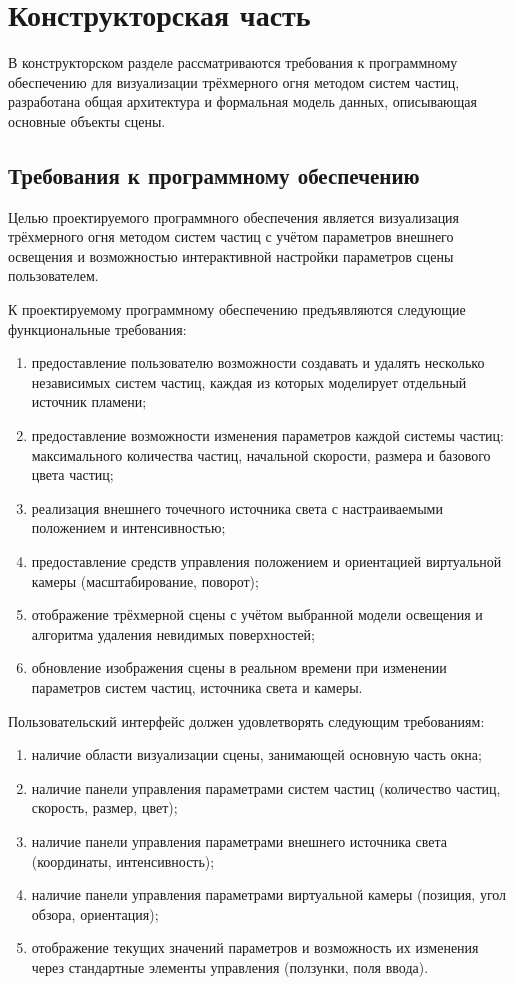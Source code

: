 \chapter{Конструкторская часть}
В конструкторском разделе рассматриваются требования к программному обеспечению для визуализации трёхмерного огня методом систем частиц, разработана общая архитектура и формальная модель данных, описывающая основные объекты сцены.

\section{Требования к программному обеспечению}

Целью проектируемого программного обеспечения является визуализация трёхмерного огня методом систем частиц с учётом параметров внешнего освещения и возможностью интерактивной настройки параметров сцены пользователем.

К проектируемому программному обеспечению предъявляются следующие функциональные требования:
\begin{enumerate}
	\item предоставление пользователю возможности создавать и удалять несколько независимых систем частиц, каждая из которых моделирует отдельный источник пламени;
	\item предоставление возможности изменения параметров каждой системы частиц: максимального количества частиц, начальной скорости, размера и базового цвета частиц;
	\item реализация внешнего точечного источника света с настраиваемыми положением и интенсивностью;
	\item предоставление средств управления положением и ориентацией виртуальной камеры (масштабирование, поворот);
	\item отображение трёхмерной сцены с учётом выбранной модели освещения и алгоритма удаления невидимых поверхностей;
	\item обновление изображения сцены в реальном времени при изменении параметров систем частиц, источника света и камеры.
\end{enumerate}

Пользовательский интерфейс должен удовлетворять следующим требованиям:
\begin{enumerate}
	\item наличие области визуализации сцены, занимающей основную часть окна;
	\item наличие панели управления параметрами систем частиц (количество частиц, скорость, размер, цвет);
	\item наличие панели управления параметрами внешнего источника света (координаты, интенсивность);
	\item наличие панели управления параметрами виртуальной камеры (позиция, угол обзора, ориентация);
	\item отображение текущих значений параметров и возможность их изменения через стандартные элементы управления (ползунки, поля ввода).
\end{enumerate}

